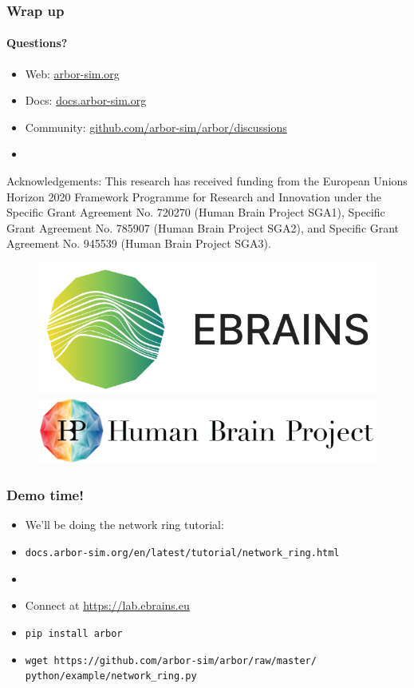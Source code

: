 \documentclass[t]{beamer}
\begin{document}
\begin{frame}
    \frametitle{Wrap up}
    \framesubtitle{Questions?}
    \begin{itemize}
        \item Web: \url{arbor-sim.org}
        \item Docs: \url{docs.arbor-sim.org}
        \item Community: \url{github.com/arbor-sim/arbor/discussions}
        \item[]
    \end{itemize}

    { \scriptsize Acknowledgements: This research has received funding from the European Unions
    Horizon 2020 Framework Programme for Research and
    Innovation under the Specific Grant Agreement No. 720270
    (Human Brain Project SGA1), Specific Grant Agreement No.
    785907 (Human Brain Project SGA2), and Specific Grant
    Agreement No. 945539 (Human Brain Project SGA3). }
    \newline
    \begin{figure}[h]
        \begin{center}
            \includegraphics[width=0.2\linewidth]{ebrains_logo.png}
            \hspace{2em}
            \includegraphics[width=0.4\linewidth]{HBP_logo.jpg}
        \end{center}
    \end{figure}
\end{frame}

\begin{frame}
    \frametitle{Demo time!}
    \begin{itemize}
    \item We'll be doing the network ring tutorial:
    \item[] \texttt{docs.arbor-sim.org/en/latest/tutorial/network\_ring.html}
    \item[]
    \item Connect at \url{https://lab.ebrains.eu}
    \item \texttt{pip install arbor}
    \item \texttt{wget https://github.com/arbor-sim/arbor/raw/master/ python/example/network\_ring.py}
    \end{itemize}
\end{frame}
\end{document}
